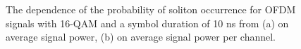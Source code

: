 \begin{figure}[htpb]
    \begin{minipage}[h]{0.47\linewidth}
    \end{minipage}
    \hfill
    \begin{minipage}[h]{0.47\linewidth}
    \end{minipage}

    \caption{The dependence of the probability of soliton occurrence for OFDM signals with 16-QAM and a symbol duration of 10 ns from (a) on average signal power, (b) on average signal power per channel.}
    \label{fig:ofdm_result_16qam}
\end{figure}

